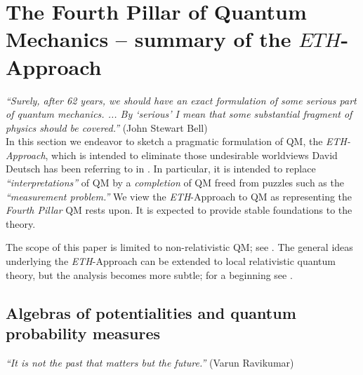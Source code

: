 \documentclass[12pt]{article}
\begin{document}
\section{The Fourth Pillar of Quantum Mechanics -- summary of the $\mathbf{\textit{ETH}}$-Approach}\label{ETH}

\hspace{0.5cm}\textit{``Surely, after 62 years, we should have an exact formulation of some serious part of quantum mechanics. ... By `serious' I mean that some substantial fragment of physics should be covered.''} (John Stewart Bell)\\

In this section we endeavor to sketch a pragmatic formulation of QM, the \textit{ETH-Approach}, which is intended to
eliminate those undesirable worldviews David Deutsch has been referring to in \cite{Deutsch}. In particular, it is intended
 to replace \textit{``interpretations''} of QM by a \textit{completion} of QM freed from puzzles such as the
 \textit{``measurement problem.''} We view the \textit{ETH}-Approach to QM as representing the \textit{Fourth Pillar} QM rests
 upon. It is expected to provide stable foundations to the theory.

 The scope of this paper is limited to non-relativistic QM; see
 \cite{BFS, Fr1}. The general ideas underlying the \textit{ETH}-Approach can be extended to local relativistic
 quantum theory, but the analysis becomes more subtle; for a beginning see \cite{Fr2}.

  \subsection{Algebras of potentialities and quantum probability measures}

 \hspace{0.5cm}\textit{``It is not the past that matters but the future.''} (Varun Ravikumar)
\end{document}

